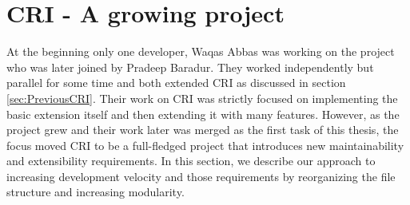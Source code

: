 \section{CRI - A growing project}
At the beginning only one developer, Waqas Abbas was working on the project who was later joined by Pradeep Baradur. They worked independently but parallel for some time and both extended CRI as discussed in section \ref{sec:PreviousCRI}. Their work on CRI was strictly focused on implementing the basic extension itself and then extending it with many features. However, as the project grew and their work later was merged as the first task of this thesis, the focus moved CRI to be a full-fledged project that introduces new maintainability and extensibility requirements. In this section, we describe our approach to increasing development velocity and those requirements by reorganizing the file structure and increasing modularity.


